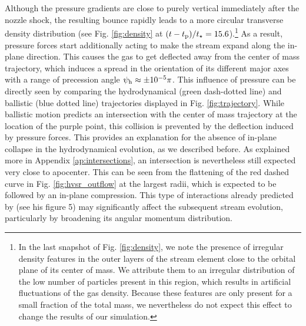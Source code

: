 \documentclass[a4paper,fleqn,usenatbib]{mnras}
\newcommand{\tp}{t_{\rm p}}
\newcommand{\tstar}{t_{\star}}
\begin{document}
Although the pressure gradients are close to purely vertical immediately after the nozzle shock, the resulting bounce rapidly leads to a more circular transverse density distribution (see Fig. \ref{fig:density} at $(t-\tp)/\tstar = 15.6$).\footnote{In the last snapshot of Fig. \ref{fig:density}, we note the presence of irregular density features in the outer layers of the stream element close to the orbital plane of its center of mass. We attribute them to an irregular distribution of the low number of particles present in this region, which results in artificial fluctuations of the gas density. Because these features are only present for a small fraction of the total mass, we nevertheless do not expect this effect to change the results of our simulation.} As a result, pressure forces start additionally acting to make the stream expand along the in-plane direction. This causes the gas to get deflected away from the center of mass trajectory, which induces a spread in the orientation of its different major axes with a range of precession angle $\psi_{\rm h} \approx \pm 10^{-5} \pi$. This influence of pressure can be directly seen by comparing the hydrodynamical (green dash-dotted line) and ballistic (blue dotted line) trajectories displayed in Fig. \ref{fig:trajectory}. While ballistic motion predicts an intersection with the center of mass trajectory at the location of the purple point, this collision is prevented by the deflection induced by pressure forces. This provides an explanation for the absence of in-plane collapse in the hydrodynamical evolution, as we described before. As explained more in Appendix \ref{ap:intersections}, an intersection is nevertheless still expected very close to apocenter. This can be seen from the flattening of the red dashed curve in Fig. \ref{fig:hvsr_outflow} at the largest radii, which is expected to be followed by an in-plane compression. This type of interactions already predicted by \citet{kochanek1994} (see his figure 5) may significantly affect the subsequent stream evolution, particularly by broadening its angular momentum distribution.
\end{document}
